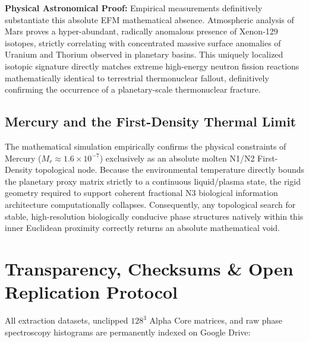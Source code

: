 \documentclass[11pt, twoside]{article}
\begin{document}
\textbf{Physical Astronomical Proof:} Empirical measurements definitively substantiate this absolute EFM mathematical absence. Atmospheric analysis of Mars proves a hyper-abundant, radically anomalous presence of Xenon-129 isotopes, strictly correlating with concentrated massive surface anomalies of Uranium and Thorium observed in planetary basins. This uniquely localized isotopic signature directly matches extreme high-energy neutron fission reactions mathematically identical to terrestrial thermonuclear fallout, definitively confirming the occurrence of a planetary-scale thermonuclear fracture.

\subsection{Mercury and the First-Density Thermal Limit}
The mathematical simulation empirically confirms the physical constraints of Mercury ($M_r \approx 1.6 \times 10^{-7}$) exclusively as an absolute molten N1/N2 First-Density topological node. Because the environmental temperature directly bounds the planetary proxy matrix strictly to a continuous liquid/plasma state, the rigid geometry required to support coherent fractional N3 biological information architecture computationally collapses. Consequently, any topological search for stable, high-resolution biologically conducive phase structures natively within this inner Euclidean proximity correctly returns an absolute mathematical void.

\section{Transparency, Checksums \& Open Replication Protocol}

All extraction datasets, unclipped $128^3$ Alpha Core matrices, and raw phase spectroscopy histograms are permanently indexed on Google Drive:

\begin{table}[H]
\centering
\caption{Replication Checkpoint Manifest for Multiplexed Solar System Extraction.}
\label{tab:replication_solar}
\end{table}
\end{document}
